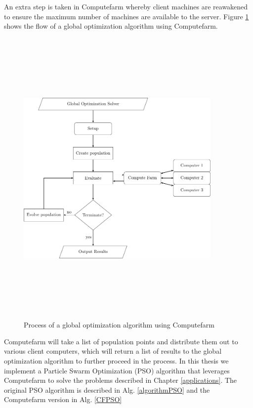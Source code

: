 An extra step is taken in Computefarm whereby client machines are reawakened to ensure the maximum number of machines are available to the server. 
  Figure \ref{fig:computefarm} shows the flow of a global optimization algorithm using Computefarm. 
\clearpage
\begin{figure}[h!]
    \centering
    \includegraphics[width=10cm,height=15cm]{chapters/chapter_3_Software/flowchart.pdf}
    \caption{Process of a global optimization algorithm using Computefarm}
    \label{fig:computefarm}
\end{figure}
Computefarm will take a list of population points and distribute them out to various client computers, which will return a list of results to the global optimization algorithm to further proceed in the process. In this thesis we implement a Particle Swarm Optimization (PSO) algorithm that leverages Computefarm to solve the problems described in Chapter \ref{applications}. The original PSO algorithm is described in Alg. \ref{algorithmPSO} and the Computefarm version in Alg. \ref{CFPSO}

